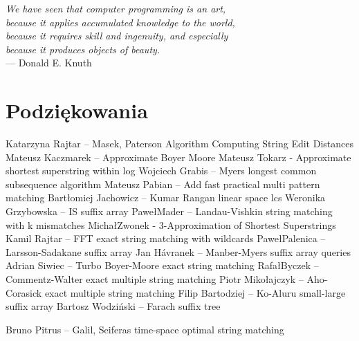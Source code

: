 

\begin{flushright}{\slshape    
We have seen that computer programming is an art, \\ 
because it applies accumulated knowledge to the world, \\ 
because it requires skill and ingenuity, and especially \\
because it produces objects of beauty.} \\ \medskip
--- Donald E. Knuth
\end{flushright}

\bigskip


\begingroup

\let\clearpage\relax
\let\cleardoublepage\relax
\let\cleardoublepage\relax

\chapter*{Podziękowania}

\noindent
Katarzyna Rajtar -- Masek, Paterson Algorithm Computing String Edit Distances
Mateusz Kaczmarek -- Approximate Boyer Moore
Mateusz Tokarz - Approximate shortest superstring within log
Wojciech Grabis -- Myers longest common subsequence algorithm
Mateusz Pabian -- Add fast practical multi pattern matching
Bartłomiej Jachowicz -- Kumar Rangan linear space lcs
Weronika Grzybowska -- IS suffix array 
Pawe\l Mader -- Landau-Vishkin string matching with k mismatches
Micha\l Zwonek - 3-Approximation of Shortest Superstrings 
Kamil Rajtar -- FFT exact string matching with wildcards
Pawe\l Palenica -- Larsson-Sadakane suffix array
Jan H\'avranek -- Manber-Myers suffix array queries
Adrian Siwiec -- Turbo Boyer-Moore exact string matching
Rafa\l Byczek -- Commentz-Walter exact multiple string matching
Piotr Miko\l{}ajczyk -- Aho-Corasick exact multiple string matching
Filip Bartodziej -- Ko-Aluru small-large suffix array
Bartosz Wodzi\'nski -- Farach suffix tree

Bruno Pitrus -- Galil, Seiferas time-space optimal string matching

\endgroup